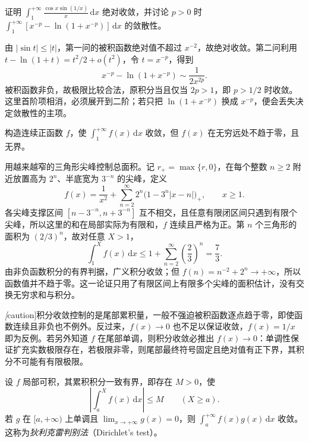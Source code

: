 \documentclass[UTF8,12pt,a4paper,fontset=fandol]{ctexbook}
\begin{document}
\begin{example}
\label{ex:absolute-comparison-and-log-cancellation}
证明 $\int_1^{+\infty}\frac{\cos x\sin(1/x)}x\,\mathrm{d}x$ 绝对收敛，并讨论 $p>0$ 时 $\int_1^{+\infty}[x^{-p}-\ln(1+x^{-p})]\,\mathrm{d}x$ 的敛散性。
\end{example}

\begin{solve}
由 $|\sin t|\leq|t|$，第一问的被积函数绝对值不超过 $x^{-2}$，故绝对收敛。第二问利用 $t-\ln(1+t)=t^2/2+o(t^2)$，令 $t=x^{-p}$，得到
\[
    x^{-p}-\ln(1+x^{-p})\sim\frac1{2x^{2p}}.
\]
被积函数非负，故极限比较合法，原积分当且仅当 $2p>1$，即 $p>1/2$ 时收敛。这里首阶项相消，必须展开到二阶；若只把 $\ln(1+x^{-p})$ 换成 $x^{-p}$，便会丢失决定敛散性的主项。
\end{solve}

\begin{example}
\label{ex:continuous-integrable-spikes}
构造连续正函数 $f$，使 $\int_1^{+\infty}f(x)\,\mathrm{d}x$ 收敛，但 $f(x)$ 在无穷远处不趋于零，且无界。
\end{example}

\begin{solve}
用越来越窄的三角形尖峰控制总面积。记 $r_+=\max\{r,0\}$，在每个整数 $n\geq2$ 附近放置高为 $2^n$、半底宽为 $3^{-n}$ 的尖峰，定义
\[
    f(x)=\frac1{x^2}
       +\sum_{n=2}^{\infty}2^n\bigl(1-3^n|x-n|\bigr)_+,
    \qquad x\geq1.
\]
各尖峰支撑区间 $[n-3^{-n},n+3^{-n}]$ 互不相交，且任意有限闭区间只遇到有限个尖峰，所以这里的和在局部实际为有限和，$f$ 连续且严格为正。第 $n$ 个三角形的面积为 $(2/3)^n$，故对任意 $X>1$，
\[
    \int_1^X f(x)\,\mathrm{d}x
    \leq1+\sum_{n=2}^{\infty}\left(\frac23\right)^n
    =\frac73.
\]
由非负函数积分的有界判据，广义积分收敛；但 $f(n)=n^{-2}+2^n\to+\infty$，所以函数值并不趋于零。这一论证只用了有限区间上有限多个尖峰的面积估计，没有交换无穷求和与积分。
\end{solve}

\emph[caution]{积分收敛控制的是尾部累积量，一般不强迫被积函数逐点趋于零，即使函数连续且非负也不例外。}反过来，$f(x)\to0$ 也不足以保证收敛，$f(x)=1/x$ 即为反例。若另外知道 $f$ 在尾部单调，则积分收敛必推出 $f(x)\to0$：单调性保证扩充实数极限存在，若极限非零，则尾部最终符号固定且绝对值有正下界，其积分不可能有有限极限。

\begin{theorem}[狄利克雷判别法]
\label{thm:dirichlet-test-infinite-integrals}
设 $f$ 局部可积，其累积积分一致有界，即存在 $M>0$，使
\[
    \left|\int_a^X f(x)\,\mathrm{d}x\right|\leq M
    \qquad(X\geq a).
\]
若 $g$ 在 $[a,+\infty)$ 上单调且 $\lim_{x\to+\infty}g(x)=0$，则 $\int_a^{+\infty}f(x)g(x)\,\mathrm{d}x$ 收敛。这称为\emph{狄利克雷判别法}（Dirichlet's test）。
\end{theorem}
\end{document}

